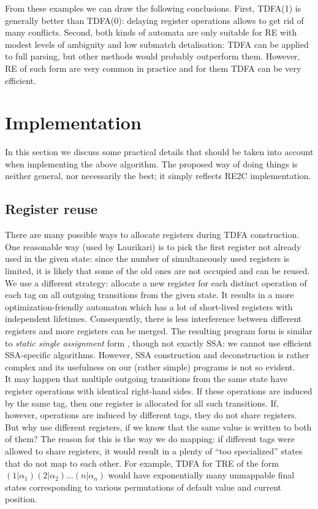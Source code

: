 \documentclass{article}
\theoremstyle{definition}
\begin{document}
\begin{multicols}{2}

From these examples we can draw the following conclusions.
First, TDFA(1) is generally better than TDFA(0): delaying register operations allows to get rid of many conflicts.
Second, both kinds of automata are only suitable for RE with modest levels of ambiguity
and low submatch detalisation: TDFA can be applied to full parsing, but other methods would probably outperform them.
However, RE of such form are very common in practice and for them TDFA can be very efficient.


\section{Implementation}\label{section_implementation}

In this section we discuss some practical details that should be taken into account when implementing the above algorithm.
The proposed way of doing things is neither general, nor necessarily the best;
it simply reflects RE2C implementation.

\subsection*{Register reuse}

There are many possible ways to allocate registers during TDFA construction.
One reasonable way (used by Laurikari) is to pick the first register not already used in the given state:
since the number of simultaneously used registers is limited,
it is likely that some of the old ones are not occupied and can be reused.
We use a different strategy: allocate a new register for each distinct operation of each tag on all outgoing transitions from the given state.
It results in a more optimization-friendly automaton
which has a lot of short-lived registers with independent lifetimes.
Consequently, there is less interference between different registers and more registers can be merged.
The resulting program form is similar to \emph{static single assignment} form \cite{SSA},
though not exactly SSA: we cannot use efficient SSA-specific algorithms.
However, SSA construction and deconstruction is rather complex and its usefulness on our (rather simple) programs is not so evident.
\\

It may happen that multiple outgoing transitions from the same state have register operations with identical right-hand sides.
If these operations are induced by the same tag, then one register is allocated for all such transitions.
If, however, operations are induced by different tags, they do not share registers.
But why use different registers, if we know that the same value is written to both of them?
The reason for this is the way we do mapping: if different tags were allowed to share registers,
it would result in a plenty of ``too specialized'' states that do not map to each other.
For example, TDFA for TRE of the form $(1 | \alpha_1) (2 | \alpha_2) \dots (n | \alpha_n)$
would have exponentially many unmappable final states
corresponding to various permutations of default value and current position.


\end{multicols}
\end{document}
